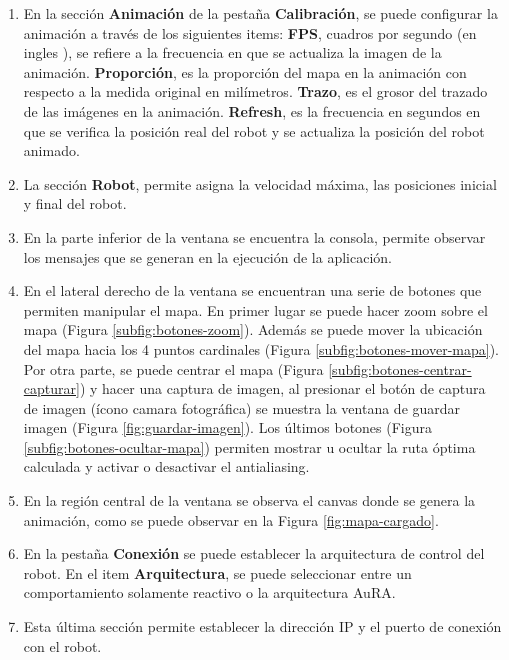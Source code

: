 \documentclass[11pt,twoside,A5]{article}
\newcommand{\reffigure}[1]{Figura \ref{#1}}
\newcommand{\refpfigure}[1]{(\reffigure{#1})}
\begin{document}
\begin{enumerate}
\item En la sección \textbf{Animación} de la pestaña \textbf{Calibración}, se puede configurar la animación 
a través de los siguientes items: \textbf{FPS}, cuadros por segundo (en ingles ), 
se refiere a la frecuencia en que se actualiza la imagen de la animación. \textbf{Proporción}, es la proporción del mapa en 
la animación con respecto a la medida original en milímetros. \textbf{Trazo}, es el grosor del trazado de las imágenes en la 
animación. \textbf{Refresh}, es la frecuencia en segundos en que se verifica la posición real del robot y se actualiza la 
posición del robot animado.
\item La sección \textbf{Robot}, permite asigna la velocidad máxima, las posiciones inicial y final del robot. 
\item En la parte inferior de la ventana se encuentra la consola, permite observar los mensajes que se generan en la ejecución
de la aplicación.
\item En el lateral derecho de la ventana se encuentran una serie de botones que permiten manipular el mapa.
 En primer lugar 
se puede hacer zoom sobre el mapa \refpfigure{subfig:botones-zoom}. Además se puede mover la ubicación del mapa hacia los 4 puntos 
cardinales \refpfigure{subfig:botones-mover-mapa}. Por otra parte, se puede centrar el mapa \refpfigure{subfig:botones-centrar-capturar} y hacer una captura de imagen, al presionar el botón de captura de imagen (ícono camara fotográfica) se
muestra la ventana de guardar imagen \refpfigure{fig:guardar-imagen}. Los últimos botones \refpfigure{subfig:botones-ocultar-mapa} permiten mostrar u ocultar
la ruta óptima calculada y activar o desactivar el antialiasing.
\item En la región central de la ventana se observa el canvas donde se genera la animación, 
como se puede observar en la \reffigure{fig:mapa-cargado}. 
\item En la pestaña \textbf{Conexión} se puede establecer la arquitectura de control del robot.
En el item \textbf{Arquitectura}, se puede seleccionar entre un comportamiento solamente reactivo
o la arquitectura AuRA.
\item Esta última sección permite establecer la dirección IP y el puerto de conexión con el robot.
\end{enumerate} 
\end{document}
